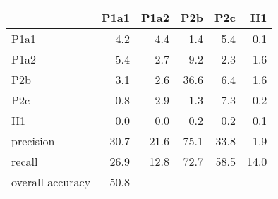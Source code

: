 \begin{tabular}{lrrrrr}
\toprule
{} &  P1a1 &  P1a2 &  P2b &  P2c &   H1 \\
\midrule
P1a1             &   4.2 &   4.4 &  1.4 &  5.4 &  0.1 \\
P1a2             &   5.4 &   2.7 &  9.2 &  2.3 &  1.6 \\
P2b              &   3.1 &   2.6 & 36.6 &  6.4 &  1.6 \\
P2c              &   0.8 &   2.9 &  1.3 &  7.3 &  0.2 \\
H1               &   0.0 &   0.0 &  0.2 &  0.2 &  0.1 \\
precision        &  30.7 &  21.6 & 75.1 & 33.8 &  1.9 \\
recall           &  26.9 &  12.8 & 72.7 & 58.5 & 14.0 \\
overall accuracy &  50.8 &       &      &      &      \\
\bottomrule
\end{tabular}
